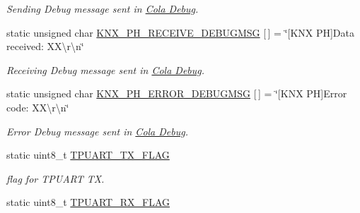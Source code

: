 \begin{DoxyCompactItemize}
\begin{DoxyCompactList}\small\item\em Sending Debug message sent in \hyperlink{group___cola___debug}{Cola Debug}. \end{DoxyCompactList}\item 
static unsigned char \hyperlink{group___k_n_x___p_h___sup___private___variables_ga29eb5f6a2e306cf5545c5a6af4623e35}{K\+N\+X\+\_\+\+P\+H\+\_\+\+R\+E\+C\+E\+I\+V\+E\+\_\+\+D\+E\+B\+U\+G\+M\+SG} \mbox{[}$\,$\mbox{]} = \char`\"{}\mbox{[}K\+NX PH\mbox{]}Data received\+: X\+X\textbackslash{}r\textbackslash{}n\char`\"{}\hypertarget{group___k_n_x___p_h___sup___private___variables_ga29eb5f6a2e306cf5545c5a6af4623e35}{}\label{group___k_n_x___p_h___sup___private___variables_ga29eb5f6a2e306cf5545c5a6af4623e35}

\begin{DoxyCompactList}\small\item\em Receiving Debug message sent in \hyperlink{group___cola___debug}{Cola Debug}. \end{DoxyCompactList}\item 
static unsigned char \hyperlink{group___k_n_x___p_h___sup___private___variables_ga598da98824813e3e2781a39bb3f90bfd}{K\+N\+X\+\_\+\+P\+H\+\_\+\+E\+R\+R\+O\+R\+\_\+\+D\+E\+B\+U\+G\+M\+SG} \mbox{[}$\,$\mbox{]} = \char`\"{}\mbox{[}K\+NX PH\mbox{]}Error code\+: X\+X\textbackslash{}r\textbackslash{}n\char`\"{}\hypertarget{group___k_n_x___p_h___sup___private___variables_ga598da98824813e3e2781a39bb3f90bfd}{}\label{group___k_n_x___p_h___sup___private___variables_ga598da98824813e3e2781a39bb3f90bfd}

\begin{DoxyCompactList}\small\item\em Error Debug message sent in \hyperlink{group___cola___debug}{Cola Debug}. \end{DoxyCompactList}\item 
static uint8\+\_\+t \hyperlink{group___k_n_x___p_h___sup___private___variables_gae5dbf66e18b65778c038cb06fcfaa990}{T\+P\+U\+A\+R\+T\+\_\+\+T\+X\+\_\+\+F\+L\+AG}\hypertarget{group___k_n_x___p_h___sup___private___variables_gae5dbf66e18b65778c038cb06fcfaa990}{}\label{group___k_n_x___p_h___sup___private___variables_gae5dbf66e18b65778c038cb06fcfaa990}

\begin{DoxyCompactList}\small\item\em flag for T\+P\+U\+A\+RT TX. \end{DoxyCompactList}\item 
static uint8\+\_\+t \hyperlink{group___k_n_x___p_h___sup___private___variables_ga56ae842ff9e457dcc93263a437c9f3ca}{T\+P\+U\+A\+R\+T\+\_\+\+R\+X\+\_\+\+F\+L\+AG}\hypertarget{group___k_n_x___p_h___sup___private___variables_ga56ae842ff9e457dcc93263a437c9f3ca}{}\label{group___k_n_x___p_h___sup___private___variables_ga56ae842ff9e457dcc93263a437c9f3ca}


\end{DoxyCompactItemize}
